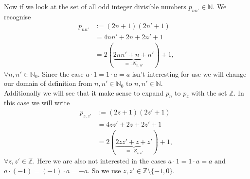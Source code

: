 Now if we look at the set of all odd integer divisible numbers $p_{nn\prime} \in \mathbb{N}$. We recognise
\begin{equation}\begin{split}
	p_{nn\prime} & := \left(2n + 1\right)\left(2n\prime + 1\right) \\
	& = 4nn\prime + 2n + 2n\prime + 1 \\
	& = 2\left(\underbrace{2nn\prime + n + n\prime}_{=:N_{n,n\prime}}\right) + 1,
\end{split}\label{eq:intdivnumbN}\end{equation} 
$\forall n,n\prime \in \mathbb{N}_{0}$. Since the case $a \cdot 1 = 1 \cdot a = a$ isn't interesting for use we will change our domain of definition from $n,n\prime \in \mathbb{N}_{0}$ to $n,n\prime \in \mathbb{N}$. \\
Additionally we will see that it make sense to expand $p_{n}$ to $p_{z}$ with the set $\mathbb{Z}$. In this case we will write
\begin{equation}\begin{split}
	p_{z,z\prime} & := \left(2z + 1\right)\left(2z\prime + 1\right) \\
	& = 4zz\prime + 2z + 2z\prime + 1 \\
	& = 2\left(\underbrace{2zz\prime + z + z\prime}_{=:Z_{z,z\prime}}\right) + 1,
\end{split}\label{eq:intdivnumbZ}\end{equation}
$\forall z,z\prime \in \mathbb{Z}$. Here we are also not interested in the cases $a \cdot 1 = 1 \cdot a = a$ and $a \cdot \left(-1\right) = \left(-1\right) \cdot a = -a$. So we use $z,z\prime \in \mathbb{Z} \setminus \{-1, 0\}$.
